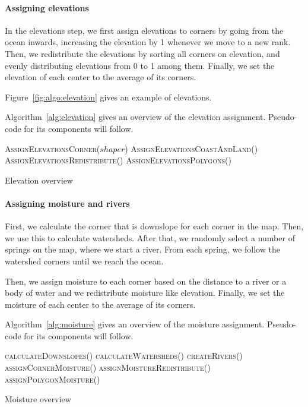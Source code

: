 \paragraph{Assigning elevations}

In the elevations step, we first assign elevations to corners by going from the ocean inwards, increasing the elevation by 1 whenever we move to a new rank.
Then, we redistribute the elevations by sorting all corners on elevation, and evenly distributing elevations from 0 to 1 among them.
Finally, we set the elevation of each center to the average of its corners.

Figure~\ref{fig:algo:elevation} gives an example of elevations.

Algorithm~\ref{alg:elevation} gives an overview of the elevation assignment.
Pseudo-code for its components will follow.

\begin{algo*}
\begin{sourcecode}
\textsc{AssignElevationsCorner}($shaper$)
\textsc{AssignElevationsCoastAndLand}()
\textsc{AssignElevationsRedistribute}()
\textsc{AssignElevationsPolygons}()
\qend
\end{sourcecode}
	\caption{Elevation overview}
	\label{alg:elevation}
\end{algo*}

\paragraph{Assigning moisture and rivers}

First, we calculate the corner that is downslope for each corner in the map.
Then, we use this to calculate watersheds.
After that, we randomly select a number of springs on the map, where we start a river.
From each spring, we follow the watershed corners until we reach the ocean.

Then, we assign moisture to each corner based on the distance to a river or a body of water and we redistribute moisture like elevation.
Finally, we set the moisture of each center to the average of its corners.

Algorithm~\ref{alg:moisture} gives an overview of the moisture assignment.
Pseudo-code for its components will follow.

\begin{algo*}
\begin{sourcecode}
\textsc{calculateDownslopes}()
\textsc{calculateWatersheds}()
\textsc{createRivers}()
\textsc{assignCornerMoisture}()
\textsc{assignMoistureRedistribute}()
\textsc{assignPolygonMoisture}()
\qend
\end{sourcecode}
	\caption{Moisture overview}
	\label{alg:moisture}
\end{algo*}

